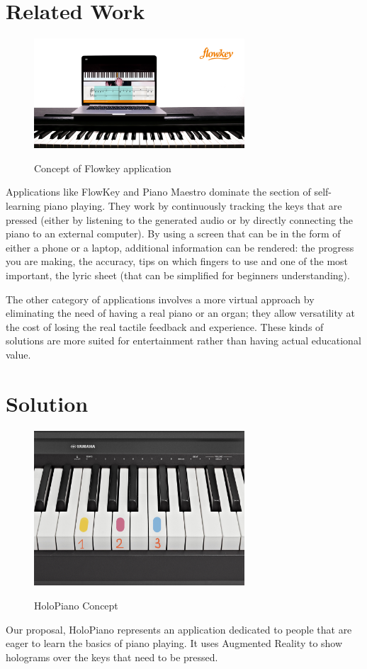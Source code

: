 \documentclass[12 pct]{report}
\begin{document}
\section{Related Work}
\begin{figure}[H]
\includegraphics[width=0.7\textwidth]{flowkey}
\centering
\label{fig:hololens}
\caption{Concept of Flowkey application}
\end{figure}

Applications like FlowKey and Piano Maestro \cite{ng2015easy} dominate the section of self-learning piano playing. They work by continuously tracking the keys that are pressed (either by listening to the generated audio or by directly connecting the piano to an external computer). By using a screen that can be in the form of either a phone or a laptop, additional information can be rendered: the progress you are making, the accuracy, tips on which fingers to use and one of the most important, the lyric sheet (that can be simplified for beginners understanding).

The other category of applications involves a more virtual approach by eliminating the need of having a real piano or an organ; they allow versatility at the cost of losing the real tactile feedback and experience. These kinds of solutions are more suited for entertainment rather than having actual educational value.

\section{Solution}
\begin{figure}[H]
\includegraphics[width=0.7\textwidth]{piano}
\centering
\label{fig:feature-points}
\caption{HoloPiano Concept}
\end{figure}
Our proposal, HoloPiano represents an application dedicated to people that are eager to learn the basics of piano playing. It uses Augmented Reality to show holograms over the keys that need to be pressed.
\end{document}
